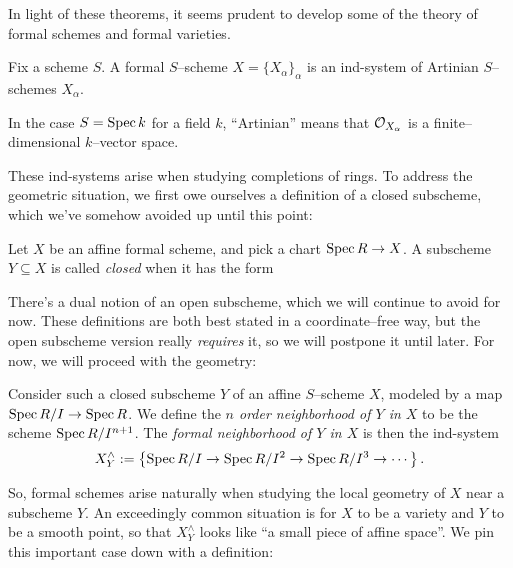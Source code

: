 In light of these theorems, it seems prudent to develop some of the theory of formal schemes and formal varieties.

\begin{definition}
Fix a scheme $S$.  A formal $S$--scheme $X = \{X_\alpha\}_\alpha$ is an ind-system of Artinian $S$--schemes $X_\alpha$.
\end{definition}

\begin{remark}
In the case $S = \operatorname{Spec} k$ for a field $k$, ``Artinian'' means that $\mathcal{O}_{X_\alpha}$ is a finite--dimensional $k$--vector space.
\end{remark}

These ind-systems arise when studying completions of rings.  To address the geometric situation, we first owe ourselves a definition of a closed subscheme, which we've somehow avoided up until this point:
\begin{definition}\label{DefnCompletion}
Let $X$ be an affine formal scheme, and pick a chart $\operatorname{Spec} R \to X$.  A subscheme $Y \subseteq X$ is called \textit{closed} when it has the form
\begin{center}
\end{center}
\end{definition}

There's a dual notion of an open subscheme, which we will continue to avoid for now.  These definitions are both best stated in a coordinate--free way, but the open subscheme version really \emph{requires} it, so we will postpone it until later.  For now, we will proceed with the geometry:

\begin{definition}
Consider such a closed subscheme $Y$ of an affine $S$--scheme $X$, modeled by a map $\operatorname{Spec} R/I \to \operatorname{Spec} R$.  We define the \textit{$n${\th} order neighborhood of $Y$ in $X$} to be the scheme $\operatorname{Spec} R/I^{n+1}$.  The \textit{formal neighborhood of $Y$ in $X$} is then the ind-system \[X^\wedge_Y := \left\{ \operatorname{Spec} R/I \to \operatorname{Spec} R/I^2 \to \operatorname{Spec} R/I^3 \to \cdots \right\}.\]
\end{definition}

\noindent So, formal schemes arise naturally when studying the local geometry of $X$ near a subscheme $Y$.  An exceedingly common situation is for $X$ to be a variety and $Y$ to be a smooth point, so that $X^\wedge_Y$ looks like ``a small piece of affine space''.  We pin this important case down with a definition:

